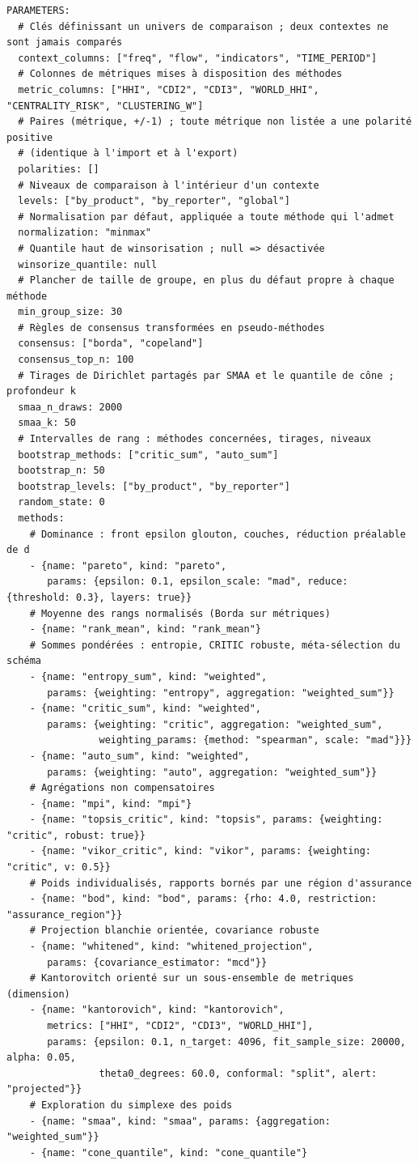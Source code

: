 \documentclass[11pt,a4paper]{article}
\theoremstyle{definition}
\theoremstyle{remark}
\begin{document}
\begin{lstlisting}
PARAMETERS:
  # Clés définissant un univers de comparaison ; deux contextes ne sont jamais comparés
  context_columns: ["freq", "flow", "indicators", "TIME_PERIOD"]
  # Colonnes de métriques mises à disposition des méthodes
  metric_columns: ["HHI", "CDI2", "CDI3", "WORLD_HHI", "CENTRALITY_RISK", "CLUSTERING_W"]
  # Paires (métrique, +/-1) ; toute métrique non listée a une polarité positive
  # (identique à l'import et à l'export)
  polarities: []
  # Niveaux de comparaison à l'intérieur d'un contexte
  levels: ["by_product", "by_reporter", "global"]
  # Normalisation par défaut, appliquée a toute méthode qui l'admet
  normalization: "minmax"
  # Quantile haut de winsorisation ; null => désactivée
  winsorize_quantile: null
  # Plancher de taille de groupe, en plus du défaut propre à chaque méthode
  min_group_size: 30
  # Règles de consensus transformées en pseudo-méthodes
  consensus: ["borda", "copeland"]
  consensus_top_n: 100
  # Tirages de Dirichlet partagés par SMAA et le quantile de cône ; profondeur k
  smaa_n_draws: 2000
  smaa_k: 50
  # Intervalles de rang : méthodes concernées, tirages, niveaux
  bootstrap_methods: ["critic_sum", "auto_sum"]
  bootstrap_n: 50
  bootstrap_levels: ["by_product", "by_reporter"]
  random_state: 0
  methods:
    # Dominance : front epsilon glouton, couches, réduction préalable de d
    - {name: "pareto", kind: "pareto",
       params: {epsilon: 0.1, epsilon_scale: "mad", reduce: {threshold: 0.3}, layers: true}}
    # Moyenne des rangs normalisés (Borda sur métriques)
    - {name: "rank_mean", kind: "rank_mean"}
    # Sommes pondérées : entropie, CRITIC robuste, méta-sélection du schéma
    - {name: "entropy_sum", kind: "weighted",
       params: {weighting: "entropy", aggregation: "weighted_sum"}}
    - {name: "critic_sum", kind: "weighted",
       params: {weighting: "critic", aggregation: "weighted_sum",
                weighting_params: {method: "spearman", scale: "mad"}}}
    - {name: "auto_sum", kind: "weighted",
       params: {weighting: "auto", aggregation: "weighted_sum"}}
    # Agrégations non compensatoires
    - {name: "mpi", kind: "mpi"}
    - {name: "topsis_critic", kind: "topsis", params: {weighting: "critic", robust: true}}
    - {name: "vikor_critic", kind: "vikor", params: {weighting: "critic", v: 0.5}}
    # Poids individualisés, rapports bornés par une région d'assurance
    - {name: "bod", kind: "bod", params: {rho: 4.0, restriction: "assurance_region"}}
    # Projection blanchie orientée, covariance robuste
    - {name: "whitened", kind: "whitened_projection",
       params: {covariance_estimator: "mcd"}}
    # Kantorovitch orienté sur un sous-ensemble de metriques (dimension)
    - {name: "kantorovich", kind: "kantorovich",
       metrics: ["HHI", "CDI2", "CDI3", "WORLD_HHI"],
       params: {epsilon: 0.1, n_target: 4096, fit_sample_size: 20000, alpha: 0.05,
                theta0_degrees: 60.0, conformal: "split", alert: "projected"}}
    # Exploration du simplexe des poids
    - {name: "smaa", kind: "smaa", params: {aggregation: "weighted_sum"}}
    - {name: "cone_quantile", kind: "cone_quantile"}
\end{lstlisting}
\end{document}
